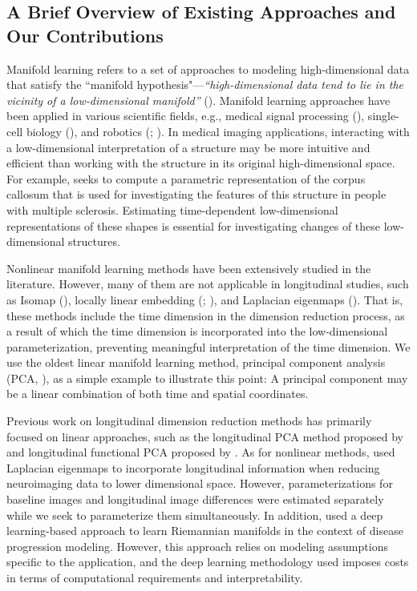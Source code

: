 \documentclass[11pt,reqno]{article}
\theoremstyle{definition}
\begin{document}
\subsection{A Brief Overview of Existing Approaches and Our Contributions}

Manifold learning refers to a set of approaches to modeling high-dimensional data that satisfy the ``manifold hypothesis"---\textit{``high-dimensional data tend to lie in the vicinity of a low-dimensional manifold''} (\cite{fefferman2016testing}). Manifold learning approaches have been applied in various scientific fields, e.g., medical signal processing (\cite{shen2022robust}), single-cell biology (\cite{ding2023learning}), and robotics (\cite{gao2023k}; \cite{gao2024bi}). In medical imaging applications, interacting with a low-dimensional interpretation of a structure may be more intuitive and efficient than working with the structure in its original high-dimensional space. For example, \cite{yueParameterizationWhiteMatter2016} seeks to compute a parametric representation of the corpus callosum that is used for investigating the features of this structure in people with multiple sclerosis. Estimating time-dependent low-dimensional representations of these shapes is essential for investigating changes of these low-dimensional structures. 

Nonlinear manifold learning methods have been extensively studied in the literature. However, many of them are not applicable in longitudinal studies, such as Isomap (\cite{tenenbaumGlobalGeometricFramework2000}), locally linear embedding (\cite{roweisNonlinearDimensionalityReduction2000}; \cite{wu2018think}), and Laplacian eigenmaps (\cite{belkin2003laplacian}). That is, these methods include the time dimension in the dimension reduction process, as a result of which the time dimension is incorporated into the low-dimensional parameterization, preventing meaningful interpretation of the time dimension. We use the oldest linear manifold learning method, principal component analysis (PCA, \cite{Pearson1901on}), as a simple example to illustrate this point: A principal component may be a linear combination of both time and spatial coordinates.

Previous work on longitudinal dimension reduction methods has primarily focused on linear approaches, such as the longitudinal PCA method proposed by \cite{kinsonLongitudinalPrincipalComponent2020} and longitudinal functional PCA proposed by \cite{greven2011longitudinal}. As for nonlinear methods, \cite{wolzManifoldLearningBiomarker2010a} used Laplacian eigenmaps to incorporate longitudinal information when reducing neuroimaging data to lower dimensional space. However, parameterizations for baseline images and longitudinal image differences were estimated separately while we seek to parameterize them simultaneously. In addition, \cite{louisRiemannianGeometryLearning2019} used a deep learning-based approach to learn Riemannian manifolds in the context of disease progression modeling. However, this approach relies on modeling assumptions specific to the application, and the deep learning methodology used imposes costs in terms of computational requirements and interpretability. 
\end{document}
